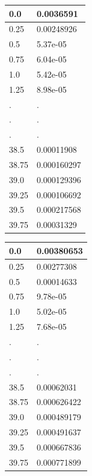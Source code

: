 \documentclass[a4paper, 12pt]{article}
\begin{document}
\begin{center}
\begin{tabular}{|l|l|}\hline
0.0&0.0036591\\ \hline
0.25&0.00248926\\ \hline
0.5&5.37e-05\\ \hline
0.75&6.04e-05\\ \hline
1.0&5.42e-05\\ \hline
1.25&8.98e-05\\ \hline
.&.\\
.&.\\
.&.\\
38.5&0.00011908\\ \hline
38.75&0.000160297\\ \hline
39.0&0.000129396\\ \hline
39.25&0.000106692\\ \hline
39.5&0.000217568\\ \hline
39.75&0.00031329\\ \hline
	\end{tabular}
\end{center}
\begin{center}
\begin{tabular}{|l|l|}\hline
0.0&0.00380653\\ \hline
0.25&0.00277308\\ \hline
0.5&0.00014633\\ \hline
0.75&9.78e-05\\ \hline
1.0&5.02e-05\\ \hline
1.25&7.68e-05\\ \hline
.&.\\
.&.\\
.&.\\
38.5&0.00062031\\ \hline
38.75&0.000626422\\ \hline
39.0&0.000489179\\ \hline
39.25&0.000491637\\ \hline
39.5&0.000667836\\ \hline
39.75&0.000771899\\ \hline
	\end{tabular}
\end{center}
\end{document}
